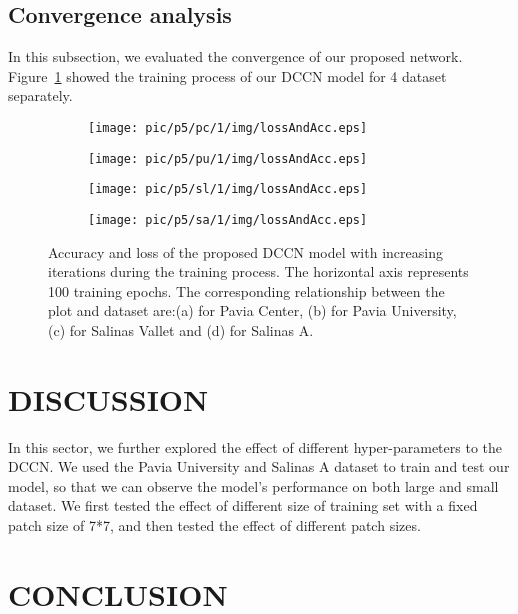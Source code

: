 \documentclass{article}
\begin{document}
	\subsection{Convergence analysis}\label{subsec:convergence}
	In this subsection, we evaluated the convergence of our proposed network.
	Figure~\ref{accandloss} showed the training process of our DCCN model for 4 dataset separately.
	\begin{figure}[htb]
		\begin{subfigure}{0.24\textwidth}
			\texttt{[image: pic/p5/pc/1/img/lossAndAcc.eps]}
			\caption{}
		\end{subfigure}
		\begin{subfigure}{0.24\textwidth}
			\texttt{[image: pic/p5/pu/1/img/lossAndAcc.eps]}
			\caption{}
		\end{subfigure}
		\begin{subfigure}{0.24\textwidth}
			\texttt{[image: pic/p5/sl/1/img/lossAndAcc.eps]}
			\caption{}
		\end{subfigure}
		\begin{subfigure}{0.24\textwidth}
			\texttt{[image: pic/p5/sa/1/img/lossAndAcc.eps]}
			\caption{}
		\end{subfigure}
		\caption{Accuracy and loss of the proposed DCCN model with increasing iterations during the training process.
		The horizontal axis represents 100 training epochs.
		The corresponding relationship between the plot and dataset are:(a) for Pavia Center, (b) for Pavia University,
			(c) for Salinas Vallet and (d) for Salinas A.}
		\label{accandloss}
	\end{figure}


	\section{DISCUSSION}\label{sec:discussion}
	In this sector, we further explored the effect of different hyper-parameters to the DCCN\@.
	We used the Pavia University and Salinas A dataset to train and test our model, so that we can observe the model's
	performance on both large and small dataset.
	We first tested the effect of different size of training set with a fixed patch size of 7*7, and then tested the
	effect of different patch sizes.


	\section{CONCLUSION}\label{sec:conclusion}


	
\end{document}
